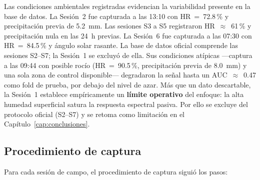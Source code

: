 Las condiciones ambientales registradas evidencian la variabilidad presente
en la base de datos. La Sesión~2 fue capturada a las 13:10 con HR~=~72.8\,\%
y precipitación previa de 5.2~mm. Las sesiones S3 a S5 registraron
HR~$\approx$~61\,\% y precipitación nula en las 24~h previas. La Sesión~6
fue capturada a las 07:30 con HR~=~84.5\,\% y ángulo solar rasante. La base
de datos oficial comprende las sesiones S2--S7; la Sesión~1 se excluyó de
ella. Sus condiciones atípicas ---captura a las 09:44 con posible rocío
(HR~=~90.5\,\%, precipitación previa de 8.0~mm) y una sola zona de control
disponible--- degradaron la señal hasta un AUC~$\approx$~0.47 como fold de
prueba, por debajo del nivel de azar. Más que un dato descartable, la
Sesión~1 establece empíricamente un \textbf{límite operativo} del enfoque: la
alta humedad superficial satura la respuesta espectral pasiva. Por ello se
excluye del protocolo oficial (S2--S7) y se retoma como limitación en el
Capítulo~\ref{cap:conclusiones}.

\subsection{Procedimiento de captura}

Para cada sesión de campo, el procedimiento de captura siguió los pasos:

